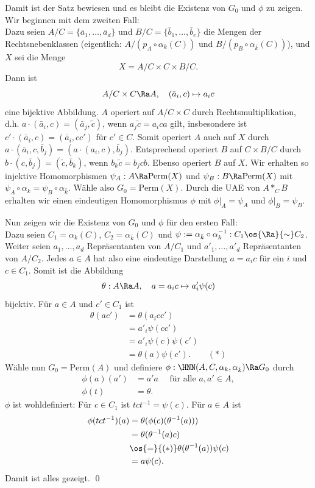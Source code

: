 Damit ist der Satz bewiesen und es bleibt die Existenz von $G_0$
und $\phi$ zu zeigen. Wir beginnen mit dem zweiten Fall:\\
Dazu seien $A/C=\{\bar{a}_1,\ldots,\bar{a}_d\}$ und
$B/C=\{\bar{b}_1,\ldots,\bar{b}_e\}$ die Mengen der Rechtsnebenklassen
(eigentlich: $A/(p_A\circ\alpha_k(C))$ und
$B/(p_B\circ\alpha_{\bar{k}}(C))$), und $X$ sei die Menge
\[
X = A/C \times C \times B/C.
\]
Dann ist
\[
A/C \times C \Ra A, \quad (\bar{a}_i,c)\mapsto a_i c
\]
eine bijektive Abbildung. $A$ operiert auf $A/C\times C$ durch
Rechtsmultiplikation,
d.h. $a\cdot(\bar{a}_i,c)=(\bar{a}_j,\tilde{c})$, wenn
$a_j\tilde{c}=a_i c a$ gilt, insbesondere ist
$c'\cdot(\bar{a}_i,c)=(\bar{a}_i,cc')$ für $c'\in C$.
Somit operiert $A$ auch auf $X$ durch
$a\cdot(\bar{a}_i,c,\bar{b}_j)=(a\cdot(a_i,c),\bar{b}_j)$.
Entsprechend operiert $B$ auf $C\times B/C$ durch
$b\cdot(c,\bar{b}_j)=(\tilde{c},\bar{b}_k)$, wenn
$b_k\tilde{c}=b_j c b$. Ebenso operiert $B$ auf $X$.
Wir erhalten so injektive Homomorphismen
$\psi_A:A\Ra\mathrm{Perm}(X)$ und $\psi_B:B\Ra\mathrm{Perm}(X)$ mit
$\psi_A\circ\alpha_k=\psi_B\circ\alpha_{\bar{k}}$.
Wähle also $G_0=\mathrm{Perm}(X)$. Durch die UAE von $A*_C B$
erhalten wir einen eindeutigen Homomorphismus $\phi$ mit
$\phi|_A=\psi_A$ und $\phi|_B=\psi_B$.

Nun zeigen wir die Existenz von $G_0$ und $\phi$ für den ersten
Fall:\\
Dazu seien $C_1=\alpha_k(C)$, $C_2=\alpha_{\bar{k}}(C)$ und
$\psi:=\alpha_{\bar{k}}\circ\alpha_k^{-1}:C_1\os{\Ra}{\sim} C_2$.
Weiter seien $a_1,\ldots,a_d$ Repräsentanten von $A/C_1$ und
$a'_1,\ldots,a'_d$ Repräsentanten von $A/C_2$. Jedes $a\in A$ hat
also eine eindeutige Darstellung $a=a_i c$ für ein $i$ und $c\in C_1$.
Somit ist die Abbildung
\[
\theta:A\Ra A,\quad a=a_i c \mapsto a_i' \psi(c)
\]
bijektiv.
Für $a\in A$ und $c'\in C_1$ ist
\begin{align*}
\theta(ac') &= \theta(a_i c c') \\
&= a'_i \psi(cc') \\
&= a'_i \psi(c)\psi(c') \\
&= \theta(a)\psi(c'). \qquad (*)
\end{align*}
Wähle nun $G_0=\mathrm{Perm}(A)$ und definiere
$\phi:\HNN(A,C,\alpha_k,\alpha_{\bar{k}})\Ra G_0$ durch
\begin{align*}
\phi(a)(a')&=a' a\quad \text{ für alle } a,a'\in A, \\
\phi(t)&=\theta.
\end{align*}
$\phi$ ist wohldefiniert: Für $c\in C_1$ ist $tct^{-1}=\psi(c)$.
Für $a\in A$ ist
\begin{align*}
\phi(tct^{-1})(a) &= \theta(\phi(c)(\theta^{-1}(a))) \\
&= \theta(\theta^{-1}(a)c) \\
&\os{=}{(*)} \theta(\theta^{-1}(a)) \psi(c) \\
&= a \psi(c).
\end{align*}
Damit ist alles gezeigt.
\qed

